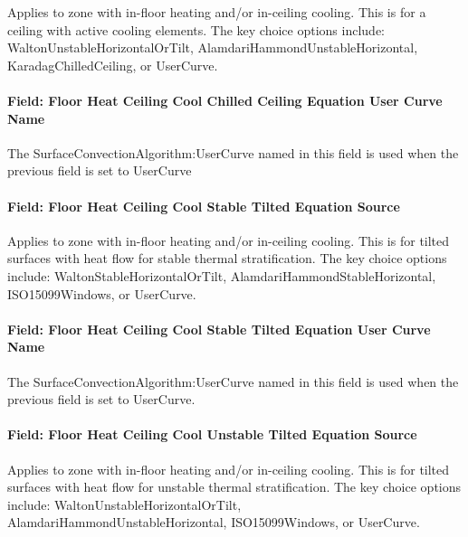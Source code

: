 Applies to zone with in-floor heating and/or in-ceiling cooling. This is for a ceiling with active cooling elements. The key choice options include: WaltonUnstableHorizontalOrTilt, AlamdariHammondUnstableHorizontal, KaradagChilledCeiling, or UserCurve.

\paragraph{Field: Floor Heat Ceiling Cool Chilled Ceiling Equation User Curve Name}\label{field-floor-heat-ceiling-cool-chilled-ceiling-equation-user-curve-name}

The SurfaceConvectionAlgorithm:UserCurve named in this field is used when the previous field is set to UserCurve

\paragraph{Field: Floor Heat Ceiling Cool Stable Tilted Equation Source}\label{field-floor-heat-ceiling-cool-stable-tilted-equation-source}

Applies to zone with in-floor heating and/or in-ceiling cooling. This is for tilted surfaces with heat flow for stable thermal stratification. The key choice options include: WaltonStableHorizontalOrTilt, AlamdariHammondStableHorizontal, ISO15099Windows, or UserCurve.

\paragraph{Field: Floor Heat Ceiling Cool Stable Tilted Equation User Curve Name}\label{field-floor-heat-ceiling-cool-stable-tilted-equation-user-curve-name}

The SurfaceConvectionAlgorithm:UserCurve named in this field is used when the previous field is set to UserCurve.

\paragraph{Field: Floor Heat Ceiling Cool Unstable Tilted Equation Source}\label{field-floor-heat-ceiling-cool-unstable-tilted-equation-source}

Applies to zone with in-floor heating and/or in-ceiling cooling. This is for tilted surfaces with heat flow for unstable thermal stratification. The key choice options include: WaltonUnstableHorizontalOrTilt, AlamdariHammondUnstableHorizontal, ISO15099Windows, or UserCurve.

